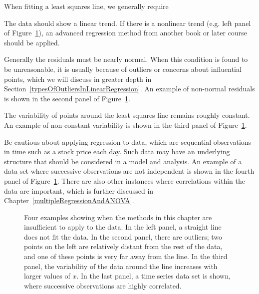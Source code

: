 When fitting a least squares line, we generally require
\begin{description}
\setlength{\itemsep}{0mm}
\item[Linearity.] The data should show a linear trend. If there is a nonlinear trend (e.g. left panel of Figure~\ref{whatCanGoWrongWithLinearModel}), an advanced regression method from another book or later course should be applied.
\item[Nearly normal residuals.] Generally the residuals must be nearly normal.
When this condition is found to be unreasonable, it is usually because of outliers or concerns about influential points, which we  will discuss in greater depth in Section~\ref{typesOfOutliersInLinearRegression}. An example of non-normal residuals is shown in the second panel of Figure~\ref{whatCanGoWrongWithLinearModel}.
\item[Constant variability.] The variability of points around the least squares line remains roughly constant. An example of non-constant variability is shown in the third panel of Figure~\ref{whatCanGoWrongWithLinearModel}.
\item[Independent observations.] Be cautious about applying regression to  data, which are sequential observations in time such as a stock price each day. Such data may have an underlying structure that should be considered in a model and analysis. An example of a data set where successive observations are not independent is shown in the fourth panel of Figure~\ref{whatCanGoWrongWithLinearModel}. There are also other instances where correlations within the data are important, which is further discussed in Chapter~\ref{multipleRegressionAndANOVA}.
\end{description}

\begin{figure}
  \centering
  \caption{Four examples showing when the methods in this
      chapter are insufficient to apply to the data.
      In the left panel, a straight line does not fit the data.
      In the second panel, there are outliers; two points on
      the left are relatively distant from the rest of the data,
      and one of these points is very far away from the line.
      In the third panel, the variability of the data around the
      line increases with larger values of $x$.
      In the last panel, a time series data set is shown,
      where successive observations are highly correlated.}
  \label{whatCanGoWrongWithLinearModel}
\end{figure}

